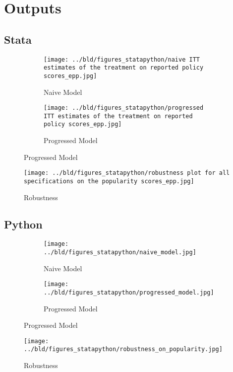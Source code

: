 \documentclass[10pt]{article}
\begin{document}
\section{Outputs}
\subsection{Stata}

\begin{figure}[H]
\begin{subfigure}{0.5\textwidth}
    \begin{center}
        \texttt{[image: ../bld/figures\_statapython/naive ITT estimates of the treatment on reported policy scores\_epp.jpg]}
    \end{center}
    \caption{Naive Model}
\end{subfigure}
\begin{subfigure}{0.5\textwidth}
    \begin{center}
        \texttt{[image: ../bld/figures\_statapython/progressed ITT estimates of the treatment on reported policy scores\_epp.jpg]}
    \end{center}
    \caption{Progressed Model}
\end{subfigure}
\end{figure}

\begin{figure}[H]
    \begin{center}
        \texttt{[image: ../bld/figures\_statapython/robustness plot for all specifications on the popularity scores\_epp.jpg]}
    \end{center}
    \caption{Robustness}
\end{figure}

\newpage
\subsection{Python}

\begin{figure}[H]
\begin{subfigure}{0.5\textwidth}
    \begin{center}
        \texttt{[image: ../bld/figures\_statapython/naive\_model.jpg]}
    \end{center}
    \caption{Naive Model}
\end{subfigure}
\begin{subfigure}{0.5\textwidth}
    \begin{center}
        \texttt{[image: ../bld/figures\_statapython/progressed\_model.jpg]}
    \end{center}
    \caption{Progressed Model}
\end{subfigure}
\end{figure}

\begin{figure}[H]
    \begin{center}
        \texttt{[image: ../bld/figures\_statapython/robustness\_on\_popularity.jpg]}
    \end{center}
    \caption{Robustness}
\end{figure}
\end{document}
